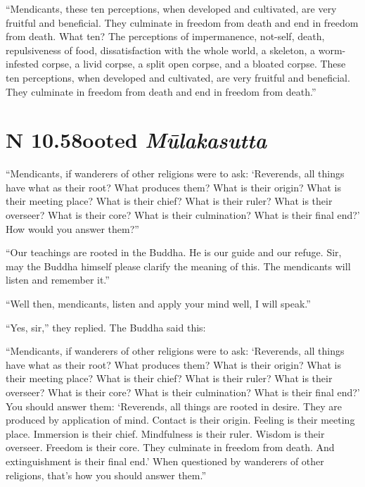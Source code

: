 \documentclass[12pt,openany]{book}%
\newcommand*{\suttatitleacronym}[1]{\smaller[2]{#1}\vspace*{.3em}}
\newcommand*{\suttatitletranslation}[1]{\linebreak{#1}}
\newcommand*{\suttatitleroot}[1]{\linebreak\smaller[2]\itshape{#1}}
\newcommand*{\tocacronym}[1]{\hspace*{-3.3em}{#1}\quad}
\newcommand*{\toctranslation}[1]{#1}
\newcommand*{\tocroot}[1]{(\textit{#1})}
\begin{document}
“Mendicants, these ten perceptions, when developed and cultivated, are very fruitful and beneficial. They culminate in freedom from death and end in freedom from death. What ten? The perceptions of impermanence, not-self, death, repulsiveness of food, dissatisfaction with the whole world, a skeleton, a worm-infested corpse, a livid corpse, a split open corpse, and a bloated corpse. These ten perceptions, when developed and cultivated, are very fruitful and beneficial. They culminate in freedom from death and end in freedom from death.” 

%
\section*{{\suttatitleacronym AN 10.58}{\suttatitletranslation Rooted }{\suttatitleroot Mūlakasutta}}
\addcontentsline{toc}{section}{\tocacronym{AN 10.58} \toctranslation{Rooted } \tocroot{Mūlakasutta}}

“Mendicants, if wanderers of other religions were to ask: ‘Reverends, all things have what as their root? What produces them? What is their origin? What is their meeting place? What is their chief? What is their ruler? What is their overseer? What is their core? What is their culmination? What is their final end?’ How would you answer them?” 

“Our teachings are rooted in the Buddha. He is our guide and our refuge. Sir, may the Buddha himself please clarify the meaning of this. The mendicants will listen and remember it.” 

“Well then, mendicants, listen and apply your mind well, I will speak.” 

“Yes, sir,” they replied. The Buddha said this: 

“Mendicants, if wanderers of other religions were to ask: ‘Reverends, all things have what as their root? What produces them? What is their origin? What is their meeting place? What is their chief? What is their ruler? What is their overseer? What is their core? What is their culmination? What is their final end?’ You should answer them: ‘Reverends, all things are rooted in desire. They are produced by application of mind. Contact is their origin. Feeling is their meeting place. Immersion is their chief. Mindfulness is their ruler. Wisdom is their overseer. Freedom is their core. They culminate in freedom from death. And extinguishment is their final end.’ When questioned by wanderers of other religions, that’s how you should answer them.” 
\end{document}
